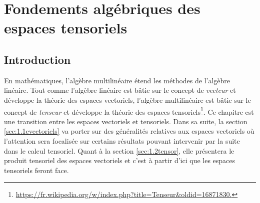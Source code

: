 \documentclass[11pt,a4paper,oneside]{book}
\begin{document}
\chapter{Fondements algébriques des espaces tensoriels}\label{chap1}
\minitoc
%
\section*{Introduction}
En mathématiques, l’algèbre multilinéaire étend les méthodes de l’algèbre linéaire. Tout comme l’algèbre
linéaire est bâtie sur le concept de \textit{vecteur} et développe la théorie des espaces vectoriels, l’algèbre
multilinéaire est bâtie sur le concept de \textit{tenseur} et développe la théorie des espaces tensoriels\footnote{\url{ https://fr.wikipedia.org/w/index.php?title=Tenseur&oldid=16871830.}}. 
Ce chapitre est une transition entre les espaces vectoriels et tensoriels. Dans sa suite, la section \ref{sec:1.1evectoriels} va porter sur des généralités relatives aux espaces vectoriels où l'attention sera focalisée sur certains résultats pouvant intervenir par la suite dans le calcul tensoriel. Quant à la section \ref{sec:1.2tensor}, elle présentera le produit tensoriel des espaces vectoriels et c'est à partir d'ici que les espaces tensoriels feront face.\\
\end{document}

